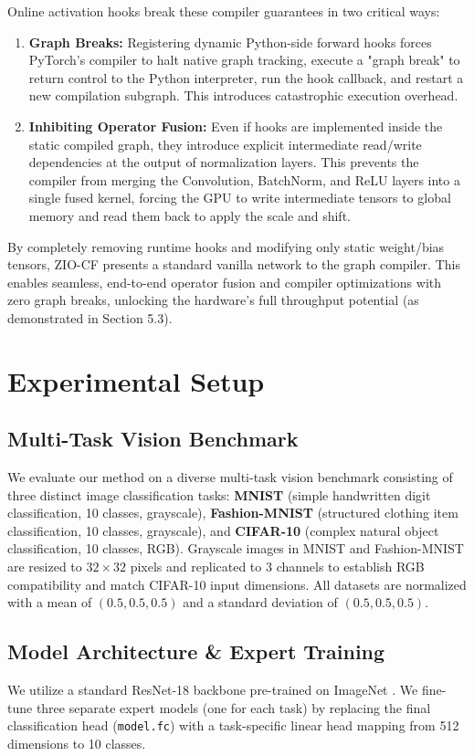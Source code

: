 \documentclass{article}
\begin{document}
Online activation hooks break these compiler guarantees in two critical ways:
\begin{enumerate}
    \item \textbf{Graph Breaks:} Registering dynamic Python-side forward hooks forces PyTorch's compiler to halt native graph tracking, execute a "graph break" to return control to the Python interpreter, run the hook callback, and restart a new compilation subgraph. This introduces catastrophic execution overhead.
    \item \textbf{Inhibiting Operator Fusion:} Even if hooks are implemented inside the static compiled graph, they introduce explicit intermediate read/write dependencies at the output of normalization layers. This prevents the compiler from merging the Convolution, BatchNorm, and ReLU layers into a single fused kernel, forcing the GPU to write intermediate tensors to global memory and read them back to apply the scale and shift.
\end{enumerate}
By completely removing runtime hooks and modifying only static weight/bias tensors, ZIO-CF presents a standard vanilla network to the graph compiler. This enables seamless, end-to-end operator fusion and compiler optimizations with zero graph breaks, unlocking the hardware's full throughput potential (as demonstrated in Section 5.3).


\section{Experimental Setup}

\subsection{Multi-Task Vision Benchmark}
We evaluate our method on a diverse multi-task vision benchmark consisting of three distinct image classification tasks: \textbf{MNIST} (simple handwritten digit classification, 10 classes, grayscale), \textbf{Fashion-MNIST} (structured clothing item classification, 10 classes, grayscale), and \textbf{CIFAR-10} (complex natural object classification, 10 classes, RGB). Grayscale images in MNIST and Fashion-MNIST are resized to $32 \times 32$ pixels and replicated to 3 channels to establish RGB compatibility and match CIFAR-10 input dimensions. All datasets are normalized with a mean of $(0.5, 0.5, 0.5)$ and a standard deviation of $(0.5, 0.5, 0.5)$.

\subsection{Model Architecture \& Expert Training}
We utilize a standard ResNet-18 backbone pre-trained on ImageNet \cite{he2016deep, deng2009imagenet}. We fine-tune three separate expert models (one for each task) by replacing the final classification head (\texttt{model.fc}) with a task-specific linear head mapping from 512 dimensions to 10 classes.
\end{document}
